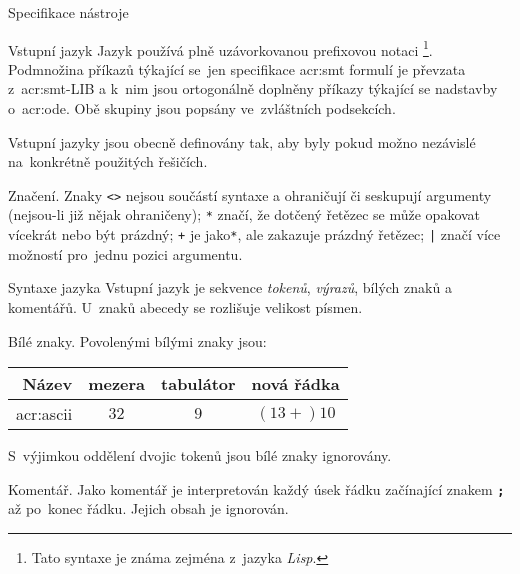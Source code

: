 \documentclass[thesis=M,czech]{FITthesis}[2012/06/26]
\newcommand{\acrlabel}[1]{acr:#1}
\newcommand{\acr}[1]{\acrshort{\acrlabel{#1}}}
\newcommand{\id}[1]{\texttt{#1}}
\newcommand{\hl}[1]{\textit{#1}}
\newcommand{\hll}[1]{\textbf{#1}}
\newcommand{\name}[1]{\hl{#1}}
\begin{document}
\begin{section}{Specifikace nástroje}
\begin{subsection}{Vstupní jazyk}
Jazyk používá plně uzávorkovanou prefixovou notaci%
\footnote{Tato syntaxe je známa zejména z~jazyka \name{Lisp}.}.
Podmnožina příkazů týkající se~jen specifikace \acr{smt} formulí
je převzata z~\acr{smt}-LIB
a k~nim jsou ortogonálně doplněny
příkazy týkající se nadstavby o~\acr{ode}.
Obě skupiny jsou popsány ve~zvláštních podsekcích.

Vstupní jazyky jsou obecně definovány tak,
aby byly pokud možno nezávislé na~konkrétně použitých řešičích.


\begin{paragraph}{Značení.}\label{ss:design:spec:ilang:sign}
Znaky \id{<>} nejsou součástí syntaxe a ohraničují či seskupují argumenty
(nejsou-li již nějak ohraničeny);
\id{*} značí, že dotčený řetězec
se může opakovat vícekrát nebo být prázdný;
\id{+} je jako\id{*}, ale zakazuje prázdný řetězec;
\id{|} značí více možností pro~jednu pozici argumentu.
\end{paragraph} %



\begin{subsubsection}{Syntaxe jazyka}\label{sss:design:spec:ilang:syntax}
Vstupní jazyk je sekvence \name{tokenů}, \name{výrazů},
bílých znaků a komentářů.
U~znaků abecedy se rozlišuje velikost písmen.


\begin{paragraph}{Bílé znaky.}\label{p:design:spec:ilang:struct:ws}
Povolenými bílými znaky jsou:
\begin{center}
\begin{tabular}{r|ccc}
   Název       & mezera & tabulátor & nová řádka \\ \hline
   \acr{ascii} &   $32$ &       $9$ &  $(13+{})10$ \\
\end{tabular}
\end{center}

S~výjimkou oddělení dvojic tokenů jsou bílé znaky ignorovány.
\end{paragraph} %


\begin{paragraph}{Komentář.}\label{p:design:spec:ilang:struct:cmt}
Jako komentář je interpretován každý úsek řádku
začínající znakem \hll{\id{;}} až po~konec řádku.
Jejich obsah je ignorován.
\end{paragraph} %


\end{subsubsection}
\end{subsection}
\end{section}
\end{document}
